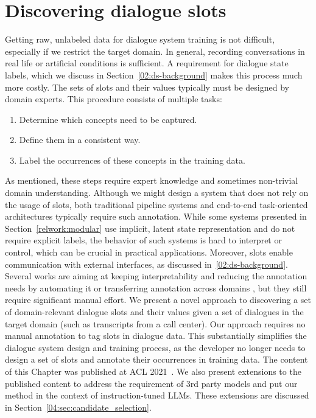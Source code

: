\chapter{Discovering dialogue slots}%
\label{chap:data_analysis}
Getting raw, unlabeled data for dialogue system training is not difficult, especially if we restrict the target domain.
In general, recording conversations in real life or artificial conditions is sufficient.
A requirement for dialogue state labels, which we discuss in Section~\ref{02:ds-background} makes this process much more costly.
The sets of slots and their values typically must be designed by domain experts.
This procedure consists of multiple tasks:
\begin{enumerate}
    \item Determine which concepts need to be captured.
    \item Define them in a consistent way.
    \item Label the occurrences of these concepts in the training data.
\end{enumerate}
As mentioned, these steps require expert knowledge and sometimes non-trivial domain understanding.
Although we might design a system that does not rely on the usage of slots, both traditional pipeline systems \cite{young_pomdp-based_2013} and end-to-end task-oriented architectures \cite{wen2016network} typically require such annotation.
While some systems presented in Section~\ref{relwork:modular} use implicit, latent state representation and do not require explicit labels, the behavior of such systems is hard to interpret or control, which can be crucial in practical applications.
Moreover, slots enable communication with external interfaces, as discussed in~\ref{02:ds-background}.
Several works are aiming at keeping interpretability and reducing the annotation needs by automating it \citep{chen2014leveraging,chen2015jointly} or transferring annotation across domains \cite{zhao_zero-shot_2018,coope_span-convert_2020}, but they still require significant manual effort.
We present a novel approach to discovering a set of domain-relevant dialogue slots and their values given a set of dialogues in the target domain (such as transcripts from a call center).
Our approach requires no manual annotation to tag slots in dialogue data.
This substantially simplifies the dialogue system design and training process, as the developer no longer needs to design a set of slots and annotate their occurrences in training data.
The content of this Chapter was published at ACL 2021~\cite{hudecek-etal-2021-discovering}.
We also present extensions to the published content to address the requirement of 3rd party models and put our method in the context of instruction-tuned LLMs.
These extensions are discussed in Section~\ref{04:sec:candidate_selection}.

